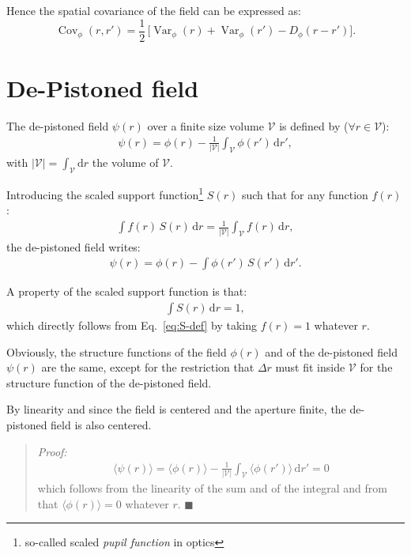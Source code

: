 \documentclass{article}
\DeclareMathOperator{\Var}{Var}
\DeclareMathOperator{\Cov}{Cov}
\begin{document}
Hence the spatial covariance of the field can be expressed as:
\begin{equation}
  \label{eq:Cov-phi}
  \Cov_{\phi}(r,r') = \frac12\,\bigl[
    \Var_{\phi}(r) + \Var_{\phi}(r') - D_{\phi}(r - r')
  \bigr].
\end{equation}


\section{De-Pistoned field}

The de-pistoned field $\psi(r)$ over a finite size volume $\mathcal{V}$ is
defined by ($\forall r \in \mathcal{V}$):
\begin{align}
  \psi(r) = \phi(r) - \frac{1}{|\mathcal{V}|} \int_{\mathcal{V}} \phi(r')\,\mathrm{d}r',
\end{align}
with $|\mathcal{V}|=\int_{\mathcal{V}}\mathrm{d}r$ the volume of $\mathcal{V}$.

Introducing the scaled support function\footnote{so-called scaled \emph{pupil
    function} in optics} $S(r)$ such that for any function $f(r)$:
\begin{align}
  \label{eq:S-def}
  \int f(r)\,S(r)\,\mathrm{d}r = \frac{1}{|\mathcal{V}|} \int_{\mathcal{V}} f(r)\,\mathrm{d}r,
\end{align}
the de-pistoned field writes:
\begin{align}
  \psi(r) = \phi(r) - \int \phi(r')\,S(r')\,\mathrm{d}r'.
\end{align}

A property of the scaled support function is that:
\begin{align}
  \int S(r)\,\mathrm{d}r = 1,
\end{align}
which directly follows from Eq.~\eqref{eq:S-def} by taking $f(r) = 1$ whatever $r$.

Obviously, the structure functions of the field $\phi(r)$ and of the
de-pistoned field $\psi(r)$ are the same, except for the restriction that
$\Delta r$ must fit inside $\mathcal{V}$ for the structure function of the
de-pistoned field.

By linearity and since the field is centered and the aperture finite, the
de-pistoned field is also centered.
\begin{quote}
  \emph{Proof:}
  \begin{align}
    \langle\psi(r)\rangle
    = \langle\phi(r)\rangle -
      \frac{1}{|\mathcal{V}|} \int_{\mathcal{V}} \langle\phi(r')\rangle\,\mathrm{d}r'
    = 0
  \end{align}
  which follows from the linearity of the sum and of the integral and from that
  $\langle\phi(r)\rangle = 0$ whatever $r$. $\blacksquare$
\end{quote}
\end{document}
